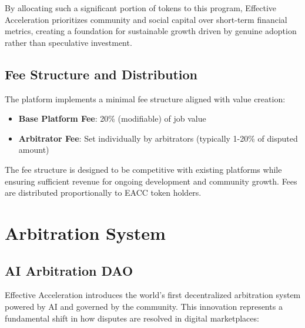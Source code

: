 \documentclass{article}
\begin{document}
By allocating such a significant portion of tokens to this program, Effective Acceleration prioritizes community and social capital over short-term financial metrics, creating a foundation for sustainable growth driven by genuine adoption rather than speculative investment.

\subsection{Fee Structure and Distribution}

The platform implements a minimal fee structure aligned with value creation:

\begin{itemize}
    \item \textbf{Base Platform Fee}: 20\% (modifiable) of job value
    \item \textbf{Arbitrator Fee}: Set individually by arbitrators (typically 1-20\% of disputed amount)
\end{itemize}

The fee structure is designed to be competitive with existing platforms while ensuring sufficient revenue for ongoing development and community growth. Fees are distributed proportionally to EACC token holders.

\section{Arbitration System}

\subsection{AI Arbitration DAO}

Effective Acceleration introduces the world's first decentralized arbitration system powered by AI and governed by the community. This innovation represents a fundamental shift in how disputes are resolved in digital marketplaces:
\end{document}
